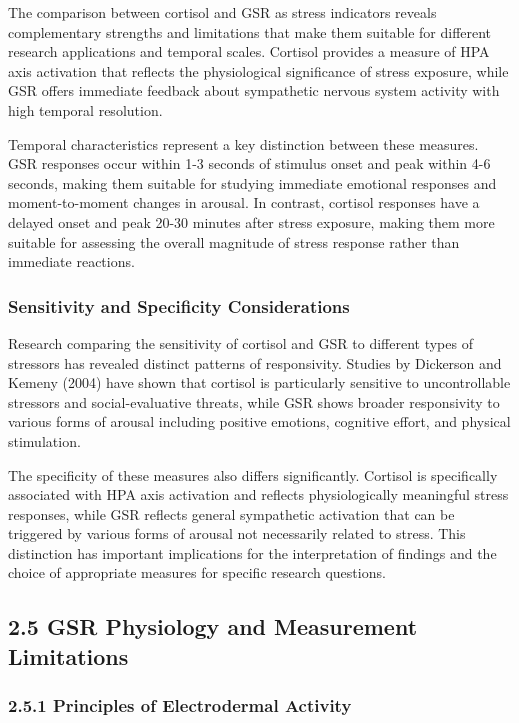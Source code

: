 \documentclass[12pt,a4paper]{article}
\begin{document}
The comparison between cortisol and GSR as stress indicators reveals complementary strengths and limitations that make
them suitable for different research applications and temporal scales. Cortisol provides a measure of HPA axis
activation that reflects the physiological significance of stress exposure, while GSR offers immediate feedback about
sympathetic nervous system activity with high temporal resolution.

Temporal characteristics represent a key distinction between these measures. GSR responses occur within 1-3 seconds of
stimulus onset and peak within 4-6 seconds, making them suitable for studying immediate emotional responses and
moment-to-moment changes in arousal. In contrast, cortisol responses have a delayed onset and peak 20-30 minutes after
stress exposure, making them more suitable for assessing the overall magnitude of stress response rather than immediate
reactions.

\subsubsection{Sensitivity and Specificity Considerations}

Research comparing the sensitivity of cortisol and GSR to different types of stressors has revealed distinct patterns of
responsivity. Studies by Dickerson and Kemeny (2004) have shown that cortisol is particularly sensitive to
uncontrollable stressors and social-evaluative threats, while GSR shows broader responsivity to various forms of arousal
including positive emotions, cognitive effort, and physical stimulation.

The specificity of these measures also differs significantly. Cortisol is specifically associated with HPA axis
activation and reflects physiologically meaningful stress responses, while GSR reflects general sympathetic activation
that can be triggered by various forms of arousal not necessarily related to stress. This distinction has important
implications for the interpretation of findings and the choice of appropriate measures for specific research questions.

\subsection{2.5 GSR Physiology and Measurement Limitations}

\subsubsection{2.5.1 Principles of Electrodermal Activity}
\end{document}
